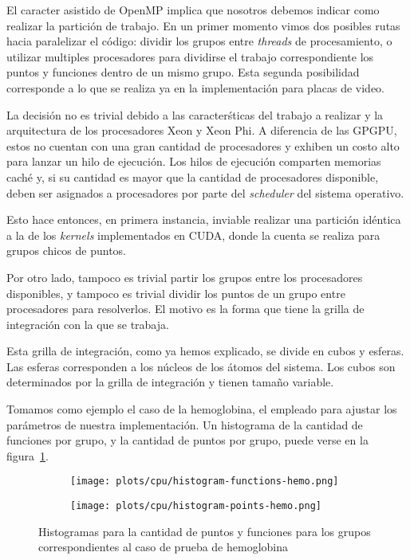 El caracter asistido de OpenMP implica que nosotros debemos indicar como 
realizar la partici\'on de trabajo. En un primer momento vimos dos posibles rutas 
hacia paralelizar el c\'odigo: dividir los grupos entre \textit{threads} de 
procesamiento, o utilizar multiples procesadores para dividirse el trabajo 
correspondiente los puntos y funciones dentro de un mismo grupo. Esta segunda
posibilidad corresponde a lo que se realiza ya en la implementaci\'on para placas
de video.

La decisi\'on no es trivial debido a las caracter\'sticas del trabajo a realizar
y la arquitectura de los procesadores Xeon y Xeon Phi. A diferencia de las GPGPU,
estos no cuentan con una gran cantidad de procesadores y exhiben un costo alto
para lanzar un hilo de ejecuci\'on. Los hilos de ejecuci\'on comparten memorias
cach\'e y, si su cantidad es mayor que la cantidad de procesadores disponible,
deben ser asignados a procesadores por parte del \textit{scheduler} del sistema
operativo.

Esto hace entonces, en primera instancia, inviable realizar una partici\'on id\'entica a 
la de los \textit{kernels} implementados en CUDA, donde la cuenta se realiza para 
grupos chicos de puntos.

Por otro lado, tampoco es trivial partir los grupos entre los procesadores disponibles,
y tampoco es trivial dividir los puntos de un grupo entre procesadores para resolverlos.
El motivo es la forma que tiene la grilla de integraci\'on con la que se trabaja.

Esta grilla de integraci\'on, como ya hemos explicado, se divide en cubos y 
esferas. Las esferas corresponden a los n\'ucleos de los \'atomos del sistema.
Los cubos son determinados por la grilla de integraci\'on y tienen tama\~no
variable. 

Tomamos como ejemplo el caso de la hemoglobina, el empleado para ajustar los
par\'ametros de nuestra implementaci\'on. Un histograma de la cantidad de 
funciones por grupo, y la cantidad de puntos por grupo, puede verse en la 
figura~\ref{fig:lio-histo-groups}.

\begin{figure}[htbp]
   \centering
   \begin{subfigure}[b]{\plotwidth}
     \texttt{[image: plots/cpu/histogram-functions-hemo.png]}
     \caption{}
   \end{subfigure}
   \begin{subfigure}[b]{\plotwidth}
     \texttt{[image: plots/cpu/histogram-points-hemo.png]}
     \caption{}
   \end{subfigure}
   \caption{Histogramas para la cantidad de puntos y funciones para los grupos correspondientes al caso de prueba
   de hemoglobina}
   \label{fig:lio-histo-groups}
\end{figure}

